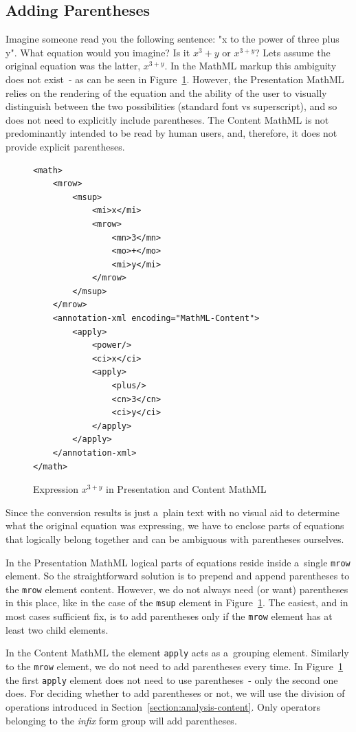 \documentclass[11pt,oneside,final]{fithesis2}
\begin{document}
\subsection{Adding Parentheses}
Imagine someone read you the following sentence: "x to the power of three plus y". What equation would you imagine? Is it $x^{3} + y$ or $x^{3+y}$? Lets assume the original equation was the latter, $x^{3+y}$. In the MathML markup this ambiguity does not exist~- as can be seen in Figure~\ref{fig:addingbraces}. However, the Presentation MathML relies on the rendering of the equation and the ability of the user to visually distinguish between the two possibilities (standard font vs superscript), and so does not need to explicitly include parentheses. The Content MathML is not predominantly intended to be read by human users, and, therefore, it does not provide explicit parentheses.

\begin{figure}[!ht]
\lstset{language=XML,frame=lines}
\begin{lstlisting}
<math>
	<mrow>
		<msup>
			<mi>x</mi>
			<mrow>
				<mn>3</mn>
				<mo>+</mo>
				<mi>y</mi>
			</mrow>
		</msup>
	</mrow>
	<annotation-xml encoding="MathML-Content">
		<apply>
			<power/>
			<ci>x</ci>
			<apply>
				<plus/>
				<cn>3</cn>
				<ci>y</ci>
			</apply>
		</apply>
	</annotation-xml>
</math>
\end{lstlisting}
\caption{Expression $x^{3+y}$ in Presentation and Content MathML}
\label{fig:addingbraces}
\end{figure}

Since the conversion results is just a~plain text with no visual aid to determine what the original equation was expressing, we have to enclose parts of equations that logically belong together and can be ambiguous with parentheses ourselves. 

In the Presentation MathML logical parts of equations reside inside a~single \texttt{mrow} element. So the straightforward solution is to prepend and append parentheses to the \texttt{mrow} element content. However, we do not always need (or want) parentheses in this place, like in the case of the \texttt{msup} element in Figure~\ref{fig:addingbraces}. The easiest, and in most cases sufficient fix, is to add parentheses only if the \texttt{mrow} element has at least two child elements.

In the Content MathML the element \texttt{apply} acts as a~grouping element. Similarly to the \texttt{mrow} element, we do not need to add parentheses every time. In Figure~\ref{fig:addingbraces} the first \texttt{apply} element does not need to use parentheses~- only the second one does. For deciding whether to add parentheses or not, we will use the division of operations introduced in Section~\ref{section:analysis-content}. Only operators belonging to the \textit{infix} form group will add parentheses.
\end{document}
